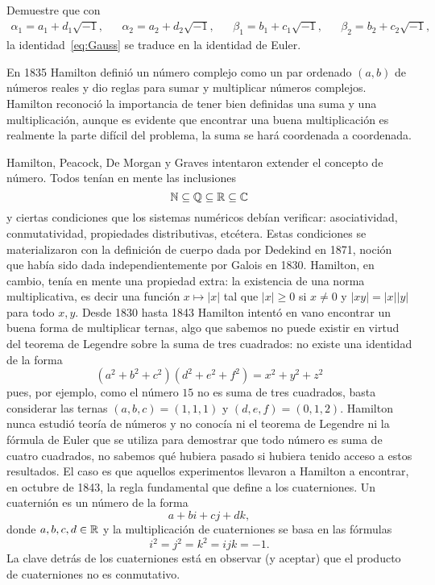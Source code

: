 \begin{exercise}
	Demuestre que con 
	\begin{align*}
		\alpha_1=a_1+d_1\sqrt{-1},
		&&
		\alpha_2=a_2+d_2\sqrt{-1},
		&&
		\beta_1=b_1+c_1\sqrt{-1}, 
		&&
		\beta_2=b_2+c_2\sqrt{-1},
	\end{align*}
	la identidad~\eqref{eq:Gauss} se traduce en la identidad de Euler. 
\end{exercise}

En 1835 Hamilton definió un número complejo como un par ordenado $(a,b)$ de
números reales y dio reglas para sumar y multiplicar números complejos.
Hamilton reconoció la importancia de tener bien definidas una suma y una
multiplicación, aunque es evidente que encontrar una buena multiplicación es
realmente la parte difícil del problema, la suma se hará coordenada a
coordenada. 

Hamilton, Peacock, De Morgan y Graves intentaron extender el concepto de
número. Todos tenían en mente las inclusiones
\[
	\mathbb{N}\subseteq\mathbb{Q}\subseteq\mathbb{R}\subseteq\mathbb{C}
\]
y ciertas condiciones que los sistemas numéricos debían verificar:
asociatividad, conmutatividad, propiedades distributivas, etcétera. Estas
condiciones se materializaron con la definición de cuerpo dada por Dedekind en
1871, noción que había sido dada independientemente por Galois en 1830.
Hamilton, en cambio, tenía en mente una propiedad extra: la existencia de una
norma multiplicativa, es decir una función $x\mapsto |x|$ tal que $|x|\geq0$ si
$x\ne 0$ y $|xy|=|x||y|$ para todo $x,y$.  Desde 1830 hasta 1843 Hamilton intentó en
vano encontrar un buena forma de multiplicar ternas, algo que sabemos no puede existir en
virtud del teorema de Legendre sobre la suma de tres cuadrados: no existe 
una identidad de la forma
\[
	(a^2+b^2+c^2)(d^2+e^2+f^2)=x^2+y^2+z^2
\]
pues, por ejemplo, como el número $15$ no es suma de tres cuadrados, basta
considerar las ternas $(a,b,c)=(1,1,1)$ y $(d,e,f)=(0,1,2)$. Hamilton nunca
estudió teoría de números y no conocía ni el teorema de Legendre ni la fórmula
de Euler que se utiliza para demostrar que todo número es suma de cuatro
cuadrados, no sabemos qué hubiera pasado si hubiera tenido acceso a estos
resultados.  El caso es que aquellos experimentos llevaron a Hamilton a
encontrar, en octubre de 1843, la regla fundamental que define a los
cuaterniones. Un cuaternión es un número de la forma 
\[
	a+bi+cj+dk,
\]
donde $a,b,c,d\in\mathbb{R}$ y la multiplicación de cuaterniones se basa en las
fórmulas 
\[
	i^2=j^2=k^2=ijk=-1.
\]
La clave detrás de los cuaterniones está en observar (y aceptar) que el producto de
cuaterniones no es conmutativo. 

